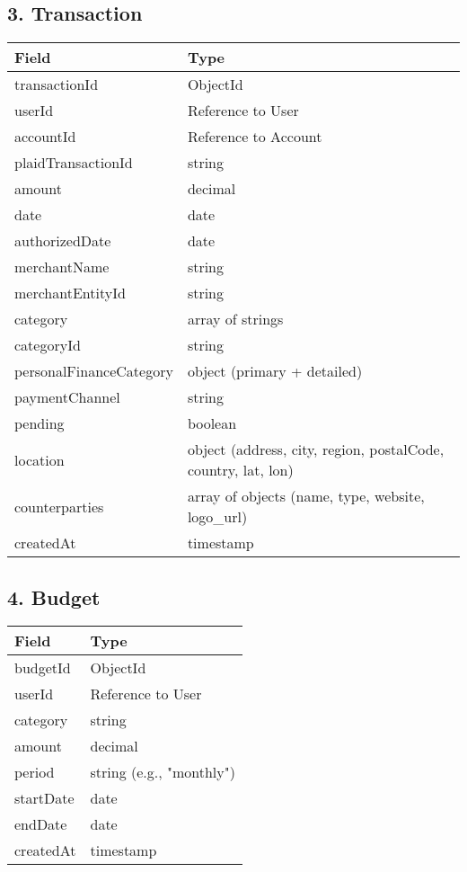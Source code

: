 \documentclass{article}
\begin{document}
\subsection*{3. Transaction}
\begin{longtable}{|l|l|}
\hline
\textbf{Field} & \textbf{Type} \\ \hline
transactionId & ObjectId \\ \hline
userId & Reference to User \\ \hline
accountId & Reference to Account \\ \hline
plaidTransactionId & string \\ \hline
amount & decimal \\ \hline
date & date \\ \hline
authorizedDate & date \\ \hline
merchantName & string \\ \hline
merchantEntityId & string \\ \hline
category & array of strings \\ \hline
categoryId & string \\ \hline
personalFinanceCategory & object (primary + detailed) \\ \hline
paymentChannel & string \\ \hline
pending & boolean \\ \hline
location & object (address, city, region, postalCode, country, lat, lon) \\ \hline
counterparties & array of objects (name, type, website, logo\_url) \\ \hline
createdAt & timestamp \\ \hline
\end{longtable}

\subsection*{4. Budget}
\begin{longtable}{|l|l|}
\hline
\textbf{Field} & \textbf{Type} \\ \hline
budgetId & ObjectId \\ \hline
userId & Reference to User \\ \hline
category & string \\ \hline
amount & decimal \\ \hline
period & string (e.g., "monthly") \\ \hline
startDate & date \\ \hline
endDate & date \\ \hline
createdAt & timestamp \\ \hline
\end{longtable}
\end{document}
